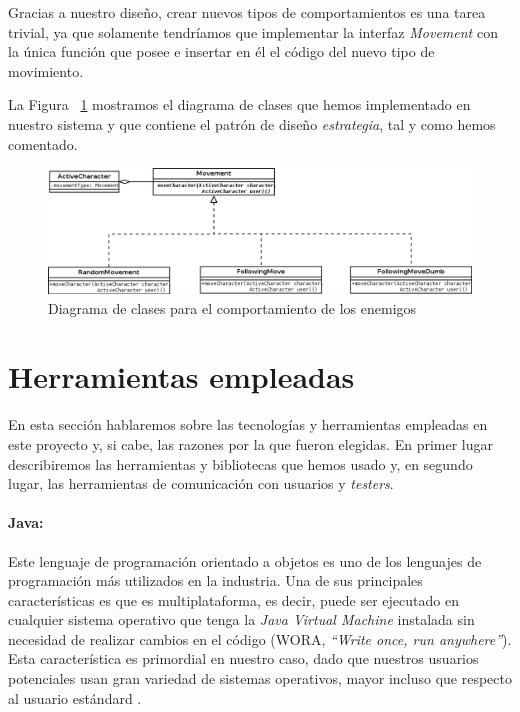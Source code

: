 \noindent Gracias a nuestro diseño, crear nuevos tipos de comportamientos es una tarea trivial, ya que solamente tendríamos que implementar la interfaz \textit{Movement} con la única función que posee e insertar en él el código del nuevo tipo de movimiento.

La Figura ~\ref{fig:iaenemy} mostramos el diagrama de clases que hemos implementado en nuestro sistema y que contiene el patrón de diseño \textit{estrategia}, tal y como hemos comentado.

\begin{figure}
    \includegraphics[width=\textwidth,height=\textheight,keepaspectratio]{./img/iaenemy.png}
  \caption{Diagrama de clases para el comportamiento de los enemigos}
  \label{fig:iaenemy}
\end{figure}

\section{Herramientas empleadas}

En esta sección hablaremos sobre las tecnologías y herramientas empleadas en este proyecto y, si cabe, las razones por la que fueron elegidas. En primer lugar describiremos las herramientas y bibliotecas que hemos usado y, en segundo lugar, las herramientas de comunicación con usuarios y \textit{testers}.

\paragraph{Java:} Este lenguaje de programación orientado a objetos es uno de los lenguajes de programación más utilizados en la industria. Una de sus principales características es que es multiplataforma, es decir, puede ser ejecutado en cualquier sistema operativo que tenga la \textit{Java Virtual Machine} instalada sin necesidad de realizar cambios en el código (WORA, \textit{``Write once, run anywhere''}). Esta característica es primordial en nuestro caso, dado que nuestros usuarios potenciales usan gran variedad de sistemas operativos, mayor incluso que respecto al usuario estándard	.

